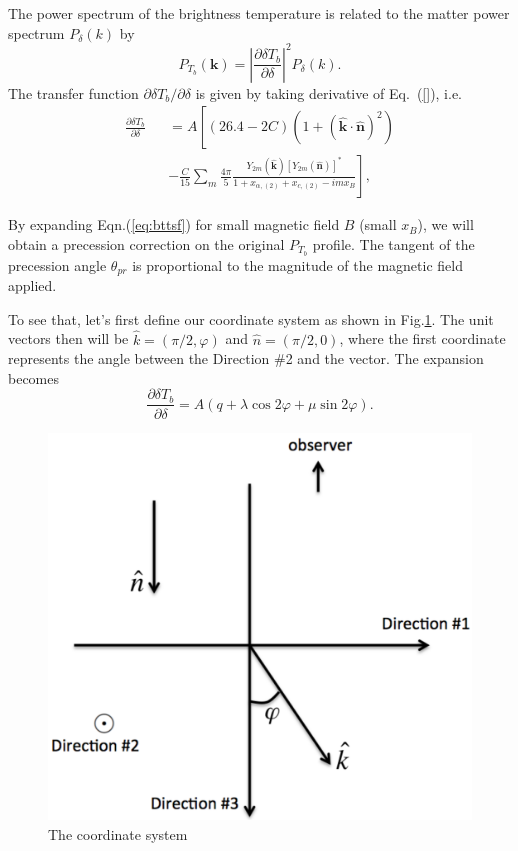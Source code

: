 The power spectrum of the brightness temperature is related to the matter power spectrum $P_\delta(k)$ by
\begin{equation}
P_{T_b}(\bm k)=\left\vert\frac{\partial\delta T_b}{\partial\delta}\right\vert^2 P_\delta(k).
\end{equation}
The transfer function $\partial\delta T_b/\partial\delta$ is given by taking derivative of Eq.~(\ref{}), i.e.~\begin{eqnarray}
\frac{\partial\delta T_b}{\partial\delta}&&=A\left[(26.4-2C)\left(1 + (\hat{\bm k} \cdot \hat{\bm n})^2\right)\right. \nonumber\\
&&\left.-\frac{C}{15}\sum_m \frac{4\pi}{5}\frac{Y_{2m}(\hat{\bm k})[Y_{2m}(\hat{\bm n})]^*}{1+x_{\alpha,(2)}+x_{c,(2)}-imx_B}\right],
\label{eq:bttsf}
\end{eqnarray}

By expanding Eqn.(\ref{eq:bttsf}) for small magnetic field $B$ (small $x_B$), we will obtain a precession correction on the original $P_{T_b}$ profile. The tangent of the precession angle $\theta_{pr}$ is proportional to the magnitude of the magnetic field applied.

To see that, let's first define our coordinate system as shown in Fig.\ref{fig:coordinate}. The unit vectors then will be $\hat{k}=(\pi/2,\varphi)$ and $\hat{n}=(\pi/2,0)$, where the first coordinate represents the angle between the Direction \#2 and the vector. The expansion becomes
\begin{equation}
\frac{\partial\delta T_b}{\partial\delta}=A(q+\lambda\cos 2\varphi+\mu\sin 2\varphi).
\label{eq:Tbtsf_simplified}
\end{equation}
\begin{figure}
\centering
\includegraphics[scale=0.3]{coordinate.pdf}
\caption{The coordinate system}
\label{fig:coordinate}
\end{figure}

